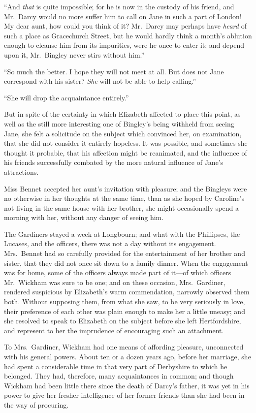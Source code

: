 ``And \emph{that} is quite impossible; for he is now in the custody of
his friend, and Mr.\ Darcy would no more suffer him to call on
Jane in such a part of London!  My dear aunt, how could you
think of it?  Mr.\ Darcy may perhaps have \emph{heard} of such a
place as Gracechurch Street, but he would hardly think a
month's ablution enough to cleanse him from its impurities, were
he once to enter it; and depend upon it, Mr.\ Bingley never stirs
without him.''

``So much the better.  I hope they will not meet at all.  But does
not Jane correspond with his sister?  \emph{She} will not be able to
help calling.''

``She will drop the acquaintance entirely.''

But in spite of the certainty in which Elizabeth affected to place
this point, as well as the still more interesting one of Bingley's
being withheld from seeing Jane, she felt a solicitude on the
subject which convinced her, on examination, that she did not
consider it entirely hopeless.  It was possible, and sometimes she
thought it probable, that his affection might be reanimated, and
the influence of his friends successfully combated by the more
natural influence of Jane's attractions.

Miss Bennet accepted her aunt's invitation with pleasure; and
the Bingleys were no otherwise in her thoughts at the same time,
than as she hoped by Caroline's not living in the same house
with her brother, she might occasionally spend a morning with
her, without any danger of seeing him.

The Gardiners stayed a week at Longbourn; and what with the
Phillipses, the Lucases, and the officers, there was not a day
without its engagement.  Mrs.\ Bennet had so carefully provided
for the entertainment of her brother and sister, that they did
not once sit down to a family dinner.  When the engagement was
for home, some of the officers always made part of it---of
which officers Mr.\ Wickham was sure to be one; and on these
occasion, Mrs.\ Gardiner, rendered suspicious by Elizabeth's
warm commendation, narrowly observed them both.  Without
supposing them, from what she saw, to be very seriously in love,
their preference of each other was plain enough to make her a
little uneasy; and she resolved to speak to Elizabeth on the
subject before she left Hertfordshire, and represent to her the
imprudence of encouraging such an attachment.

To Mrs.\ Gardiner, Wickham had one means of affording pleasure,
unconnected with his general powers.  About ten or a dozen years
ago, before her marriage, she had spent a considerable time in
that very part of Derbyshire to which he belonged.  They had,
therefore, many acquaintances in common; and though Wickham had
been little there since the death of Darcy's father, it was yet
in his power to give her fresher intelligence of her former
friends than she had been in the way of procuring.

